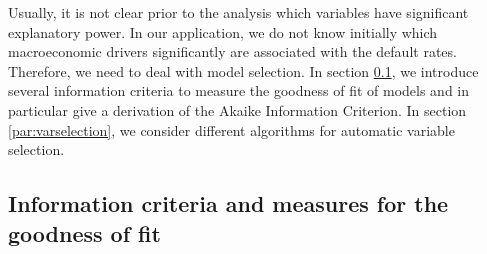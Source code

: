 \documentclass[a4paper, 12pt]{scrreprt}
\begin{document}
Usually, it is not clear prior to the analysis which variables have significant explanatory power. In our application, we do not know initially which macroeconomic drivers significantly are associated with the default rates. Therefore, we need to deal with model selection. In section \ref{par:informationcriteria}, we introduce several information criteria to measure the goodness of fit of models and in particular give a derivation of the Akaike Information Criterion. In section \ref{par:varselection}, we consider different algorithms for automatic variable selection.

\subsection{Information criteria and measures for the goodness of fit}\label{par:informationcriteria}
\end{document}
